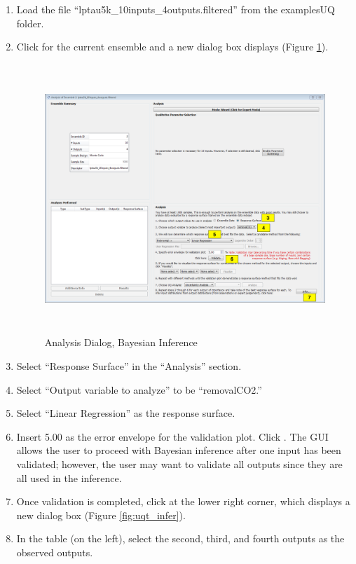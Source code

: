 \begin{enumerate}
\item{Load the file ``lptau5k\_10inputs\_4outputs.filtered'' from the examples\bs UQ folder.}
\item{Click  for the current ensemble and a new dialog box displays (Figure \ref{fig:uqt_analysis_infer}).
\begin{figure}[H]
\centering \includegraphics[width=6.5in,height=4in,keepaspectratio]{Chapt_uq/figs/tutorial/29_InfSelection2}
\caption{Analysis Dialog, Bayesian Inference}
\label{fig:uqt_analysis_infer}
\end{figure}
}
\item{Select ``Response Surface'' in the ``Analysis'' section.}
\item{Select ``Output variable to analyze'' to be ``removalCO2.''}
\item{Select ``Linear Regression'' as the response surface.}
\item{Insert 5.00 as the error envelope for the validation plot. Click . The GUI allows the user to proceed with Bayesian
  inference after one input has been validated; however, the user may want
  to validate all outputs since they are all used in the inference.}
\item{Once validation is completed, click  at the lower right
  corner, which displays a new dialog box (Figure \ref{fig:uqt_infer}).}
\item{In the  table (on the left), select the second, third, and fourth outputs as the observed outputs.
}
\end{enumerate}
